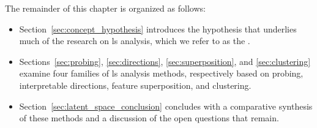 The remainder of this chapter is organized as follows:
\begin{itemize}
    \item Section~\ref{sec:concept_hypothesis} introduces the hypothesis that underlies much of the research on \gls{ls} analysis, which we refer to as the \ConceptHypothesisName.
    \item Sections~\ref{sec:probing}, \ref{sec:directions}, \ref{sec:superposition}, and \ref{sec:clustering} examine four families of \gls{ls} analysis methods, respectively based on probing, interpretable directions, feature superposition, and clustering.
    \item Section~\ref{sec:latent_space_conclusion} concludes with a comparative synthesis of these methods and a discussion of the open questions that remain.
\end{itemize}






